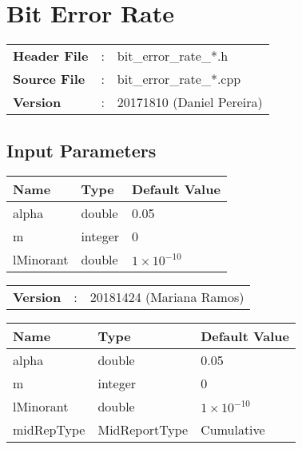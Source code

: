 \clearpage

\section{Bit Error Rate}

\begin{refsection}

\begin{tcolorbox}	
\begin{tabular}{p{2.75cm} p{0.2cm} p{10.5cm}} 	
\textbf{Header File}   &:& bit\_error\_rate\_*.h \\
\textbf{Source File}   &:& bit\_error\_rate\_*.cpp \\
\textbf{Version}       &:& 20171810 (Daniel Pereira)
\end{tabular}
\end{tcolorbox}

\subsection*{Input Parameters}

\begin{table}[H]
\centering
\begin{tabular}{|l|l|l|}
\hline
Name           & Type           & Default Value     \\ \hline
alpha          & double         & 0.05              \\ \hline
m              & integer        & 0                 \\ \hline
lMinorant      & double         & $1\times10^{-10}$ \\ \hline
\end{tabular}
\end{table}

\begin{tcolorbox}	
\begin{tabular}{p{2.75cm} p{0.2cm} p{10.5cm}} 	
\textbf{Version}       &:& 20181424 (Mariana Ramos)
\end{tabular}
\end{tcolorbox}

\begin{table}[H]
\centering
\begin{tabular}{|l|l|l|}
\hline
Name           & Type           & Default Value     \\ \hline
alpha          & double         & 0.05              \\ \hline
m              & integer        & 0                 \\ \hline
lMinorant      & double         & $1\times10^{-10}$ \\ \hline
midRepType     & MidReportType  & Cumulative \\ \hline
\end{tabular}
\end{table}


\end{refsection}
